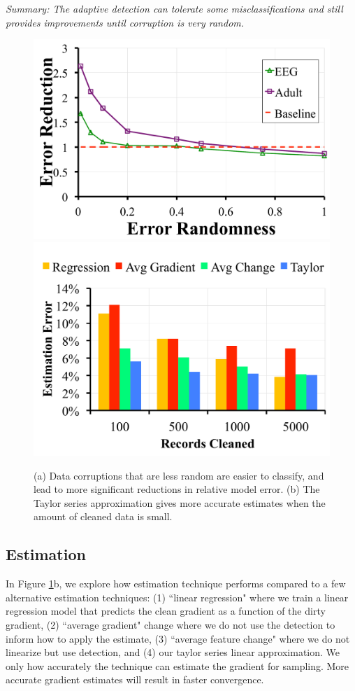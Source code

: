 \vspace{0.25em}

\noindent \emph{Summary: The adaptive detection can tolerate some misclassifications and still provides improvements until corruption is very random. }

\begin{figure}[ht!]
\vspace{-1em}
\centering
 \includegraphics[width=0.49\columnwidth]{exp/exp5a.pdf}
 \includegraphics[width=0.49\columnwidth]{exp/exp12.pdf}
 \caption{(a) Data corruptions that are less random are easier to classify, and lead to more significant reductions in relative model error. (b) The Taylor series approximation gives more accurate estimates when the amount of cleaned data is small. \label{tradeoffs2}}
\end{figure}

\subsection{Estimation}\label{est}
In Figure \ref{tradeoffs2}b, we explore how estimation technique performs compared to a few alternative estimation techniques: (1) ``linear regression" where we train a linear regression model that predicts the clean gradient as a function of the dirty gradient, (2) ``average gradient" change where we do not use the detection to inform how to apply the estimate, (3) ``average feature change" where we do not linearize but use detection, and (4) our taylor series linear approximation.
We only how accurately the technique can estimate the gradient for sampling.
More accurate gradient estimates will result in faster convergence.

